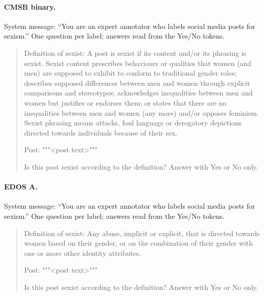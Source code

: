 \paragraph{CMSB binary.} System message: ``You are an expert annotator who labels social media posts for sexism.'' One question per label; answers read from the Yes/No tokens.
\begin{quote}\footnotesize\ttfamily\raggedright Definition of sexist: A post is sexist if its content and/or its phrasing is sexist. Sexist content prescribes behaviours or qualities that women (and men) are supposed to exhibit to conform to traditional gender roles; describes supposed differences between men and women through explicit comparisons and stereotypes; acknowledges inequalities between men and women but justifies or endorses them; or states that there are no inequalities between men and women (any more) and/or opposes feminism. Sexist phrasing means attacks, foul language or derogatory depictions directed towards individuals because of their sex.

Post: """<post text>"""

Is this post sexist according to the definition? Answer with Yes or No only.\end{quote}

\paragraph{EDOS A.} System message: ``You are an expert annotator who labels social media posts for sexism.'' One question per label; answers read from the Yes/No tokens.
\begin{quote}\footnotesize\ttfamily\raggedright Definition of sexist: Any abuse, implicit or explicit, that is directed towards women based on their gender, or on the combination of their gender with one or more other identity attributes.

Post: """<post text>"""

Is this post sexist according to the definition? Answer with Yes or No only.\end{quote}

